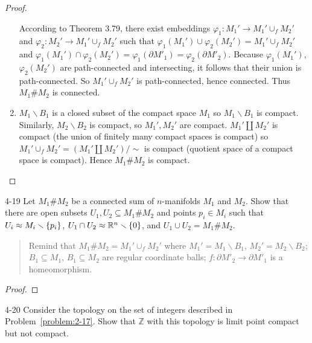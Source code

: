 \begin{proof}
\begin{enumerate}[label={(\alph*)}]
		      According to Theorem 3.79, there exist embeddings $\varphi_{1}: M_{1}' \to M_{1}' \cup_{f} M_{2}'$ and $\varphi_{2}: M_{2}' \to M_{1}' \cup_{f} M_{2}'$ such that $\varphi_{1}(M_{1}') \cup \varphi_{2}(M_{2}') = M_{1}' \cup_{f} M_{2}'$ and $\varphi_{1}(M_{1}') \cap \varphi_{2}(M_{2}') = \varphi_{1}(\partial M'_{1}) = \varphi_{2}(\partial M'_{2})$. Because $\varphi_{1}(M_{1}')$, $\varphi_{2}(M_{2}')$ are path-connected and intersecting, it follows that their union is path-connected. So $M_{1}' \cup_{f} M_{2}'$ is path-connected, hence connected. Thus $M_{1} \# M_{2}$ is connected.
		\item $M_{1}\smallsetminus B_{1}$ is a closed subset of the compact space $M_{1}$ so $M_{1}\smallsetminus B_{1}$ is compact. Similarly, $M_{2}\smallsetminus B_{2}$ is compact, so $M_{1}', M_{2}'$ are compact. $M_{1}' \amalg M_{2}'$ is compact (the union of finitely many compact spaces is compact) so $M_{1}' \cup_{f} M_{2}' = (M_{1}' \amalg M_{2}')/\sim$ is compact (quotient space of a compact space is compact). Hence $M_{1}\# M_{2}$ is compact.
	\end{enumerate}
\end{proof}

\begin{problem}{4-19}
Let $M_{1} \# M_{2}$ be a connected sum of $n$-manifolds $M_{1}$ and $M_{2}$. Show that there are open subsets $U_{1}, U_{2} \subseteq M_{1} \# M_{2}$ and points $p_{i} \in M_{i}$ such that $U_{i} \approx M_{i}\smallsetminus \left\{{p_{i}}\right\}$, $U_{1} \cap U_{2} \approx \mathbb{R}^{n}\smallsetminus \left\{{0}\right\}$, and $U_{1} \cup U_{2} = M_{1} \# M_{2}$.
\end{problem}

\begin{quotation}
	Remind that $M_{1} \# M_{2} = M_{1}' \cup_{f} M_{2}'$ where $M_{1}' = M_{1}\smallsetminus B_{1}$, $M_{2}' = M_{2}\smallsetminus B_{2}$; $B_{1} \subseteq M_{1}$, $B_{1} \subseteq M_{2}$ are regular coordinate balls; $f: \partial M'_{2} \to \partial M'_{1}$ is a homeomorphism.
\end{quotation}


\begin{proof}
\end{proof}

\begin{problem}{4-20}
Consider the topology on the set of integers described in Problem~\ref{problem:2-17}. Show that $\mathbb{Z}$ with this topology is limit point compact but not compact.
\end{problem}


